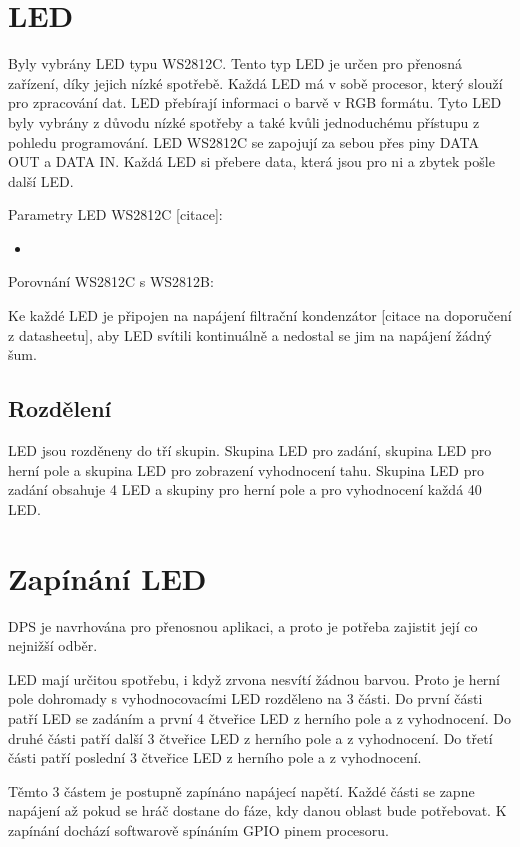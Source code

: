 \section{LED}
Byly vybrány LED typu WS2812C. Tento typ LED je určen pro přenosná zařízení, díky jejich nízké spotřebě. Každá LED 
má v sobě procesor, který slouží pro zpracování dat. LED přebírají informaci o barvě v RGB formátu. 
Tyto LED byly vybrány z důvodu nízké spotřeby a také kvůli jednoduchému přístupu z pohledu programování.
LED WS2812C se zapojují za sebou přes piny DATA OUT a DATA IN. Každá LED si přebere data, která jsou pro ni a zbytek pošle 
další LED.

Parametry LED WS2812C [citace]: %
\begin{itemize}
    \item 
\end{itemize}

Porovnání WS2812C s WS2812B:

Ke každé LED je připojen na napájení filtrační kondenzátor [citace na doporučení z datasheetu], aby LED svítili kontinuálně 
a nedostal se jim na napájení žádný šum.

\subsection{Rozdělení}
LED jsou rozděneny do tří skupin. Skupina LED pro zadání, skupina LED pro herní pole a skupina LED pro zobrazení vyhodnocení 
tahu.
Skupina LED pro zadání obsahuje 4 LED a skupiny pro herní pole a pro vyhodnocení každá 40 LED.

\section{Zapínání LED}
DPS je navrhována pro přenosnou aplikaci, a proto je potřeba zajistit její co nejnižší odběr. 

LED mají určitou spotřebu, i když zrvona nesvítí žádnou barvou. Proto je herní pole dohromady s vyhodnocovacími LED rozděleno 
na 3 části. Do první části patří LED se zadáním a první 4 čtveřice LED z herního pole a z vyhodnocení. Do druhé části patří 
další 3 čtveřice LED z herního pole a z vyhodnocení. Do třetí části patří poslední 3 čtveřice LED z herního pole a z 
vyhodnocení.

Těmto 3 částem je postupně zapínáno napájecí napětí. Každé části se zapne napájení až pokud se hráč dostane do fáze, kdy 
danou oblast bude potřebovat. K zapínání dochází softwarově spínáním GPIO pinem procesoru.

